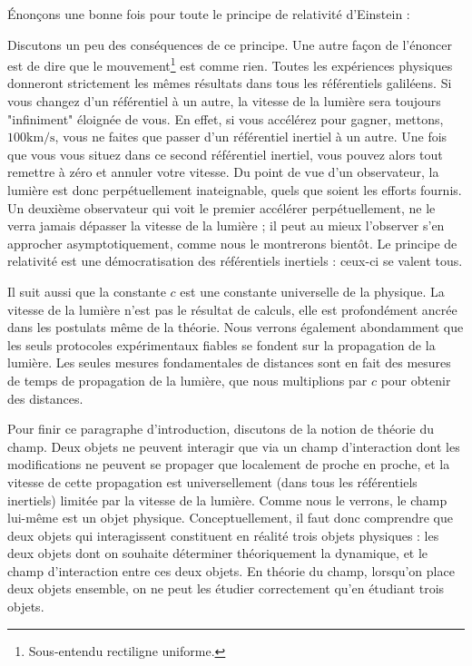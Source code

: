 		Énonçons une bonne fois pour toute le principe de relativité d'Einstein :

		\hspace{-0.5cm}

		Discutons un peu des conséquences de ce principe. Une autre façon de l'énoncer est de dire que le mouvement\footnote{Sous-entendu rectiligne uniforme.} est comme rien.  Toutes les expériences physiques donneront strictement les mêmes résultats dans tous les référentiels galiléens. Si vous changez d'un référentiel à un autre, la vitesse de la lumière sera toujours "infiniment" éloignée de vous. En effet, si vous accélérez pour gagner, mettons, $100\mathrm{km}/\mathrm{s}$, vous ne faites que passer d'un référentiel inertiel à un autre. Une fois que vous vous situez dans ce second référentiel inertiel, vous pouvez alors tout remettre à zéro et annuler votre vitesse. Du point de vue d'un observateur, la lumière est donc perpétuellement inateignable, quels que soient les efforts fournis. Un deuxième observateur qui voit le premier accélérer perpétuellement, ne le verra jamais dépasser la vitesse de la lumière ; il peut au mieux l'observer s'en approcher asymptotiquement, comme nous le montrerons bientôt. Le principe de relativité est une démocratisation des référentiels inertiels : ceux-ci se valent tous.

		Il suit aussi que la constante $c$ est une constante universelle de la physique. La vitesse de la lumière n'est pas le résultat de calculs, elle est profondément ancrée dans les postulats même de la théorie. Nous verrons également abondamment que les seuls protocoles expérimentaux fiables se fondent sur la propagation de la lumière. Les seules mesures fondamentales de distances sont en fait des mesures de temps de propagation de la lumière, que nous multiplions par $c$ pour obtenir des distances.

		Pour finir ce paragraphe d'introduction, discutons de la notion de théorie du champ. Deux objets ne peuvent interagir que via un champ d'interaction dont les modifications ne peuvent se propager que localement de proche en proche, et la vitesse de cette propagation est universellement (dans tous les référentiels inertiels) limitée par la vitesse de la lumière. Comme nous le verrons, le champ lui-même est un objet physique. Conceptuellement, il faut donc comprendre que deux objets qui interagissent constituent en réalité trois objets physiques : les deux objets dont on souhaite déterminer théoriquement la dynamique, et le champ d'interaction entre ces deux objets. En théorie du champ, lorsqu'on place deux objets ensemble, on ne peut les étudier correctement qu'en étudiant trois objets.

